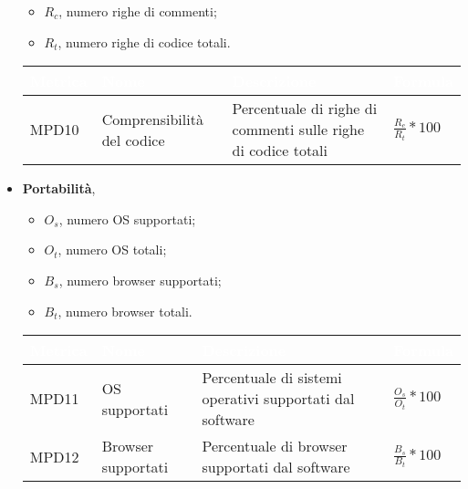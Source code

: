 \begin{itemize}
            \begin{itemize}
                \item $R_c$, numero righe di commenti;
                \item $R_t$, numero righe di codice totali.
            \end{itemize}
            \renewcommand\arraystretch{1,5}
            \begin{center}
                \begin{tabular}{|p{1.7cm}|p{3cm}|p{4.5cm}|p{3cm}|} \hline
                  \rowcolor[HTML]{036400}
                  \textcolor[HTML]{FFFFFF}{\textbf{Metrica}} & \textcolor[HTML]{FFFFFF}{\textbf{Nome}} & \textcolor[HTML]{FFFFFF}{\textbf{Descrizione}} & \textcolor[HTML]{FFFFFF}{\textbf{Formula}}    \\ \hline
                  \rowcolor[HTML]{EFEFEF}
                  MPD10 & Comprensibilità del codice & Percentuale di righe di commenti sulle righe di codice totali & $\frac{R_c}{R_t}*100$  \\ \hline
                \end{tabular}
            \end{center}
            \renewcommand\arraystretch{1}
        \item \textbf{Portabilità},
            \begin{itemize}
                \item $O_s$, numero OS supportati;
                \item $O_t$, numero OS totali;
                \item $B_s$, numero browser supportati;
                \item $B_t$, numero browser totali.
            \end{itemize}
            \renewcommand\arraystretch{1,5}
            \begin{center}
                \begin{tabular}{|p{1.7cm}|p{3cm}|p{4.5cm}|p{3cm}|} \hline
                  \rowcolor[HTML]{036400}
                  \textcolor[HTML]{FFFFFF}{\textbf{Metrica}} & \textcolor[HTML]{FFFFFF}{\textbf{Nome}} & \textcolor[HTML]{FFFFFF}{\textbf{Descrizione}} & \textcolor[HTML]{FFFFFF}{\textbf{Formula}}    \\ \hline
                  \rowcolor[HTML]{EFEFEF}
                  MPD11 & OS supportati & Percentuale di sistemi operativi supportati dal software & $\frac{O_s}{O_t}*100$  \\ \hline
                  \rowcolor[HTML]{C0C0C0}
                  MPD12 & Browser supportati & Percentuale di browser supportati dal software & $\frac{B_s}{B_t}*100$  \\ \hline
                \end{tabular}
            \end{center}
            \renewcommand\arraystretch{1}
   \end{itemize}

